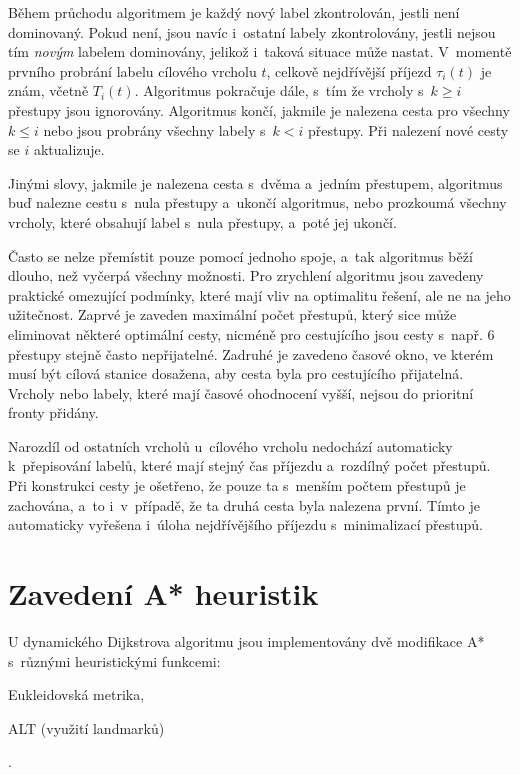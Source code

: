 Během průchodu algoritmem je každý nový label zkontrolován, jestli není dominovaný. Pokud není, jsou navíc i~ostatní labely zkontrolovány, jestli nejsou tím \emph{novým} labelem dominovány, jelikož i~taková situace může nastat. V~momentě prvního probrání labelu cílového vrcholu $t$, celkově nejdřívější příjezd \(\tau_i(t)\) je znám, včetně $T_i(t)$. Algoritmus pokračuje dále, s~tím že vrcholy s~$k \geq i$ přestupy jsou ignorovány. Algoritmus končí, jakmile je nalezena cesta pro všechny $k \leq i$ nebo jsou probrány všechny labely s~$k < i$ přestupy. Při nalezení nové cesty se \(i\) aktualizuje.

Jinými slovy, jakmile je nalezena cesta s~dvěma a~jedním přestupem, algoritmus buď nalezne cestu s~nula přestupy a~ukončí algoritmus, nebo prozkoumá všechny vrcholy, které obsahují label s~nula přestupy, a~poté jej ukončí.

Často se nelze přemístit pouze pomocí jednoho spoje, a~tak algoritmus běží dlouho, než vyčerpá všechny možnosti. Pro zrychlení algoritmu jsou zavedeny praktické omezující podmínky, které mají vliv na optimalitu řešení, ale ne na jeho užitečnost. Zaprvé je zaveden maximální počet přestupů, který sice může eliminovat některé optimální cesty, nicméně pro cestujícího jsou cesty s~např. 6 přestupy stejně často nepřijatelné. Zadruhé je zavedeno časové okno, ve kterém musí být cílová stanice dosažena, aby cesta byla pro cestujícího přijatelná. Vrcholy nebo labely, které mají časové ohodnocení vyšší, nejsou do prioritní fronty přidány.

Narozdíl od ostatních vrcholů u~cílového vrcholu nedochází automaticky k~přepisování labelů, které mají stejný čas příjezdu a~rozdílný počet přestupů. Při konstrukci cesty je ošetřeno, že pouze ta s~menším počtem přestupů je zachována, a~to i~v~případě, že ta druhá cesta byla nalezena první. Tímto je automaticky vyřešena i~úloha nejdřívějšího příjezdu s~minimalizací přestupů.

\section{Zavedení A* heuristik}
U dynamického Dijkstrova algoritmu jsou implementovány dvě modifikace A* s~různými heuristickými funkcemi: 
\begin{enumerate*}[label=\roman*)]
	\item Eukleidovská metrika,
	\item ALT (využití landmarků)
\end{enumerate*}.

